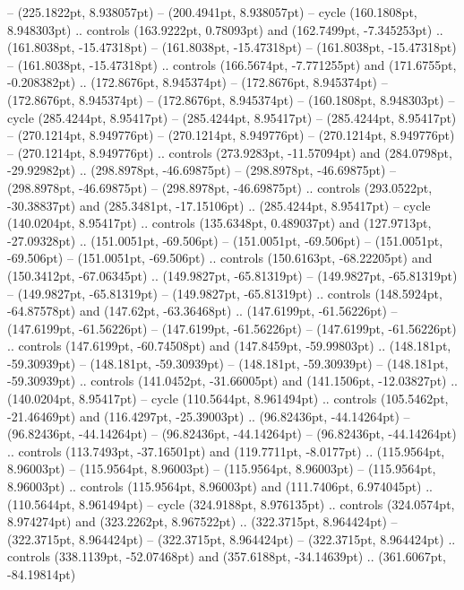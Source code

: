  -- (225.1822pt, 8.938057pt)
 -- (200.4941pt, 8.938057pt) -- cycle
(160.1808pt, 8.948303pt) .. controls (163.9222pt, 0.78093pt) and (162.7499pt, -7.345253pt) .. (161.8038pt, -15.47318pt)
 -- (161.8038pt, -15.47318pt)
 -- (161.8038pt, -15.47318pt)
 -- (161.8038pt, -15.47318pt) .. controls (166.5674pt, -7.771255pt) and (171.6755pt, -0.208382pt) .. (172.8676pt, 8.945374pt)
 -- (172.8676pt, 8.945374pt)
 -- (172.8676pt, 8.945374pt)
 -- (172.8676pt, 8.945374pt)
 -- (160.1808pt, 8.948303pt) -- cycle
(285.4244pt, 8.95417pt) -- (285.4244pt, 8.95417pt)
 -- (285.4244pt, 8.95417pt)
 -- (270.1214pt, 8.949776pt)
 -- (270.1214pt, 8.949776pt)
 -- (270.1214pt, 8.949776pt)
 -- (270.1214pt, 8.949776pt) .. controls (273.9283pt, -11.57094pt) and (284.0798pt, -29.92982pt) .. (298.8978pt, -46.69875pt)
 -- (298.8978pt, -46.69875pt)
 -- (298.8978pt, -46.69875pt)
 -- (298.8978pt, -46.69875pt) .. controls (293.0522pt, -30.38837pt) and (285.3481pt, -17.15106pt) .. (285.4244pt, 8.95417pt) -- cycle
(140.0204pt, 8.95417pt) .. controls (135.6348pt, 0.489037pt) and (127.9713pt, -27.09328pt) .. (151.0051pt, -69.506pt)
 -- (151.0051pt, -69.506pt)
 -- (151.0051pt, -69.506pt)
 -- (151.0051pt, -69.506pt) .. controls (150.6163pt, -68.22205pt) and (150.3412pt, -67.06345pt) .. (149.9827pt, -65.81319pt)
 -- (149.9827pt, -65.81319pt)
 -- (149.9827pt, -65.81319pt)
 -- (149.9827pt, -65.81319pt) .. controls (148.5924pt, -64.87578pt) and (147.62pt, -63.36468pt) .. (147.6199pt, -61.56226pt)
 -- (147.6199pt, -61.56226pt)
 -- (147.6199pt, -61.56226pt)
 -- (147.6199pt, -61.56226pt) .. controls (147.6199pt, -60.74508pt) and (147.8459pt, -59.99803pt) .. (148.181pt, -59.30939pt)
 -- (148.181pt, -59.30939pt)
 -- (148.181pt, -59.30939pt)
 -- (148.181pt, -59.30939pt) .. controls (141.0452pt, -31.66005pt) and (141.1506pt, -12.03827pt) .. (140.0204pt, 8.95417pt) -- cycle
(110.5644pt, 8.961494pt) .. controls (105.5462pt, -21.46469pt) and (116.4297pt, -25.39003pt) .. (96.82436pt, -44.14264pt)
 -- (96.82436pt, -44.14264pt)
 -- (96.82436pt, -44.14264pt)
 -- (96.82436pt, -44.14264pt) .. controls (113.7493pt, -37.16501pt) and (119.7711pt, -8.0177pt) .. (115.9564pt, 8.96003pt)
 -- (115.9564pt, 8.96003pt)
 -- (115.9564pt, 8.96003pt)
 -- (115.9564pt, 8.96003pt) .. controls (115.9564pt, 8.96003pt) and (111.7406pt, 6.974045pt) .. (110.5644pt, 8.961494pt) -- cycle
(324.9188pt, 8.976135pt) .. controls (324.0574pt, 8.974274pt) and (323.2262pt, 8.967522pt) .. (322.3715pt, 8.964424pt)
 -- (322.3715pt, 8.964424pt)
 -- (322.3715pt, 8.964424pt)
 -- (322.3715pt, 8.964424pt) .. controls (338.1139pt, -52.07468pt) and (357.6188pt, -34.14639pt) .. (361.6067pt, -84.19814pt)
